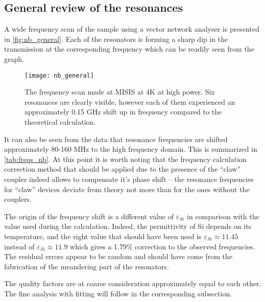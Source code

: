 \documentclass[12pt]{article}
\numberwithin{equation}{section}
\numberwithin{figure}{section}
\begin{document}
\subsection{General review of the resonances}

A wide frequency scan of the sample using a vector network analyser is presented in \autoref{fig:nb_general}. Each of the resonators is forming a sharp dip in the transmission at the corresponding frequency which can be readily seen from the graph. 

\begin{figure}[h!]
\centering
\texttt{[image: nb\_general]}
\caption{The frequency scan made at MISIS at 4K at high power. Six resonances are clearly visible, however each of them experienced an approximately 0.15 GHz shift up in frequency compared to the theoretical calculation.}
\label{fig:nb_general}
\end{figure}

It can also be seen from the data that resonance frequencies are shifted approximately 80-160 MHz to the high frequency domain. This is summarized in \autoref{tab:freqs_nb}. At this point it is worth noting that the frequency calculation correction method\cite{Sank2014} that should be applied due to the presence of the ``claw'' coupler indeed allows to compensate it's phase shift -- the resonance frequencies for ``claw'' devices deviate from theory not more than for the ones without the couplers. 

The origin of the frequency shift is a different value of $\varepsilon_{Si}$ in comparison with the value used during the calculation. Indeed, the permittivity of Si depends on its temperature\cite{Krupka2007}, and the right value that should have been used is $\varepsilon_{Si} \approx 11.45$ instead of $\varepsilon_{Si} \approx 11.9$ which gives a 1.79\% correction to the observed frequencies. The residual errors appear to be random and should have come from the fabrication of the meandering part of the resonators.

The quality factors are at coarse consideration approximately equal to each other. The fine analysis with fitting will follow in the corresponding subsection. 
\end{document}
